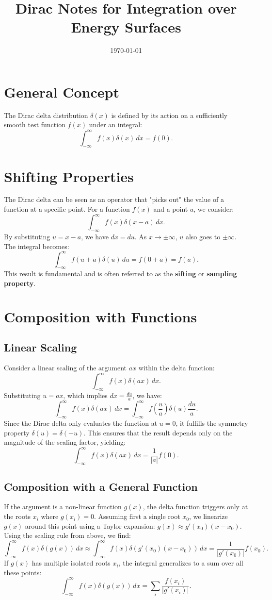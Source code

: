 \documentclass[11pt]{article}
\title{Dirac Notes for Integration over Energy Surfaces}
\author{}
\date{\today}
\begin{document}
\maketitle
\tableofcontents

\section{General Concept}
The Dirac delta distribution $\delta(x)$ is defined by its action on a sufficiently smooth test function $f(x)$ under an integral:
\[
\int_{-\infty}^{\infty} f(x) \delta(x) \, dx = f(0).
\]

\section{Shifting Properties}
The Dirac delta can be seen as an operator that "picks out" the value of a function at a specific point. For a function \( f(x) \) and a point \( a \), we consider:
\[
\int_{-\infty}^{\infty} f(x) \delta(x - a) \, dx.
\]
By substituting \( u = x - a \), we have \( dx = du \). As \( x \to \pm\infty \), \( u \) also goes to \( \pm\infty \). The integral becomes:
\[
\int_{-\infty}^{\infty} f(u + a) \delta(u) \, du = f(0 + a) = f(a).
\]
This result is fundamental and is often referred to as the \textbf{sifting} or \textbf{sampling property}.

\section{Composition with Functions}
\subsection{Linear Scaling}
Consider a linear scaling of the argument $ax$ within the delta function:
\[
\int_{-\infty}^{\infty} f(x) \delta(ax) \, dx.
\]
Substituting \( u = a x \), which implies \( dx = \frac{du}{a} \), we have:
\[
\int_{-\infty}^{\infty} f(x) \delta(a x) \, dx = \int_{-\infty}^{\infty} f\left(\frac{u}{a}\right) \delta(u) \frac{du}{a}.
\]
Since the Dirac delta only evaluates the function at \( u = 0 \), it fulfills the symmetry property \( \delta(u) = \delta(-u) \). This ensures that the result depends only on the magnitude of the scaling factor, yielding:
\[
\int_{-\infty}^{\infty} f(x) \delta(a x) \, dx = \frac{1}{|a|} f(0).
\]
\subsection{Composition with a General Function}
If the argument is a non-linear function $g(x)$, the delta function triggers only at the roots $x_i$ where $g(x_i) = 0$. 
Assuming first a single root $x_0$, we linearize $g(x)$ around this point using a Taylor expansion: $g(x) \approx g'(x_0)(x - x_0)$. Using the scaling rule from above, we find:
\[
\int_{-\infty}^{\infty} f(x) \delta(g(x)) \, dx \approx \int_{-\infty}^{\infty} f(x) \delta(g'(x_0)(x - x_0)) \, dx = \frac{1}{|g'(x_0)|} f(x_0).
\]
If $g(x)$ has multiple isolated roots $x_i$, the integral generalizes to a sum over all these points:
\[
\int_{-\infty}^{\infty} f(x) \delta(g(x)) \, dx = \sum_i \frac{f(x_i)}{|g'(x_i)|}.
\]      
\end{document}
